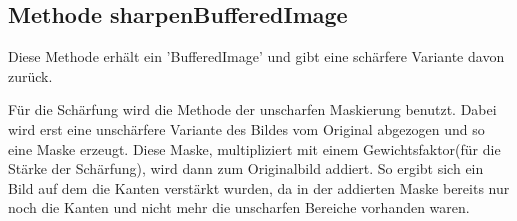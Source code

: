 \subsection*{Methode sharpenBufferedImage}
Diese Methode erhält ein 'BufferedImage' und gibt eine schärfere Variante davon zurück.

Für die Schärfung wird die Methode der unscharfen Maskierung benutzt. Dabei wird erst eine unschärfere Variante des Bildes vom Original abgezogen und so eine Maske erzeugt. Diese Maske, multipliziert mit einem Gewichtsfaktor(für die Stärke der Schärfung), wird dann zum Originalbild addiert. So ergibt sich ein Bild auf dem die Kanten verstärkt wurden, da in der addierten Maske bereits nur noch die Kanten und nicht mehr die unscharfen Bereiche vorhanden waren.